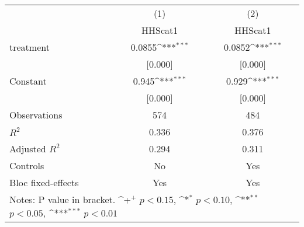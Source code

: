 {
\def\sym#1{\ifmmode^{#1}\else\(^{#1}\)\fi}
\begin{tabular*}{1.2\hsize}{@{\hskip\tabcolsep\extracolsep\fill}l*{2}{c}}
\cline{1-3}\cline{1-3}
     &\multicolumn{1}{c}{(1)}&\multicolumn{1}{c}{(2)}\\
     &\multicolumn{1}{c}{HHScat1}&\multicolumn{1}{c}{HHScat1}\\
\cline{1-3}
treatment&0.0855\sym{***}&0.0852\sym{***}\\
     &[0.000]         &[0.000]         \\
[1em]
Constant&0.945\sym{***}&0.929\sym{***}\\
     &[0.000]         &[0.000]         \\
\cline{1-3}
Observations&574         &484         \\
\(R^{2}\)&0.336         &0.376         \\
Adjusted \(R^{2}\)&0.294         &0.311         \\
Controls&No         &Yes         \\
Bloc fixed-effects&Yes         &Yes         \\
\cline{1-3}\cline{1-3}
\multicolumn{3}{p{1.0\textwidth}}{\footnotesize Notes: P value in bracket. \sym{+} \(p<0.15\), \sym{*} \(p<0.10\), \sym{**} \(p<0.05\), \sym{***} \(p<0.01\)}\\
\end{tabular*}
}
